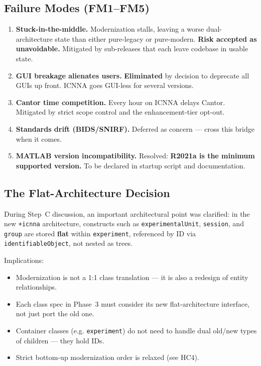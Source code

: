 \documentclass[11pt,a4paper]{article}
\begin{document}
\subsection{Failure Modes (FM1--FM5)}

\begin{enumerate}[label=\textbf{FM\arabic*.}]
    \item \textbf{Stuck-in-the-middle.} Modernization stalls, leaving a worse dual-architecture state than either pure-legacy or pure-modern. \textbf{Risk accepted as unavoidable.} Mitigated by sub-releases that each leave codebase in usable state.
    \item \textbf{GUI breakage alienates users.} \textbf{Eliminated} by decision to deprecate all GUIs up front. ICNNA goes GUI-less for several versions.
    \item \textbf{Cantor time competition.} Every hour on ICNNA delays Cantor. Mitigated by strict scope control and the enhancement-tier opt-out.
    \item \textbf{Standards drift (BIDS/SNIRF).} Deferred as concern --- cross this bridge when it comes.
    \item \textbf{MATLAB version incompatibility.} Resolved: \textbf{R2021a is the minimum supported version.} To be declared in startup script and documentation.
\end{enumerate}

\subsection{The Flat-Architecture Decision}

During Step~C discussion, an important architectural point was clarified: in the new \texttt{+icnna} architecture, constructs such as \texttt{experimentalUnit}, \texttt{session}, and \texttt{group} are stored \textbf{flat} within \texttt{experiment}, referenced by ID via \texttt{identifiableObject}, not nested as trees.

Implications:
\begin{itemize}
    \item Modernization is not a 1:1 class translation --- it is also a redesign of entity relationships.
    \item Each class spec in Phase~3 must consider its new flat-architecture interface, not just port the old one.
    \item Container classes (e.g. \texttt{experiment}) do not need to handle dual old/new types of children --- they hold IDs.
    \item Strict bottom-up modernization order is relaxed (see HC4).
\end{itemize}
\end{document}

